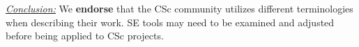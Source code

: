 \documentclass[conference,10pt]{IEEEtran}
\newenvironment{RQ}{\vspace{1mm}\begin{tcolorbox}[enhanced,width=3.4in,size=fbox,colback=red!5!white,drop shadow southeast,sharp corners]}{\end{tcolorbox}}
\begin{document}
\begin{RQ}
\textit{\underline{Conclusion:}} We \textbf{endorse} that the CSc community utilizes different terminologies when describing their work. SE tools
may need to be examined and adjusted before being applied to CSc projects.
\end{RQ} 





\end{document}
